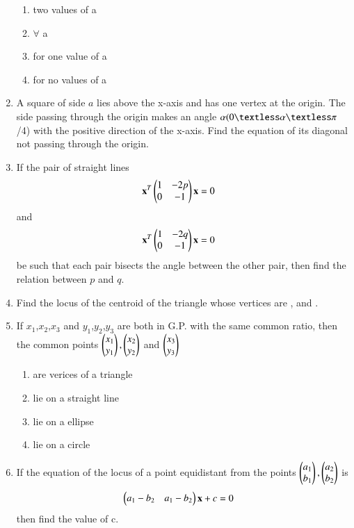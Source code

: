 \begin{enumerate}[label=\arabic*.,ref=\thesubsection.\theenumi]
    \begin{enumerate}
     \item  two values of a 
     \item  $\forall$ a
     \item  for one value of a 
     \item  for no values of a 
     \end{enumerate}
    \item A square of side $ a$ lies above the x-axis and has one vertex at the origin. The side passing through the origin makes an angle $\alpha (0\textless\alpha\textless\pi$/4) with the positive direction of the x-axis. Find the equation of its diagonal not passing through the origin.
    \item If the pair of straight lines \begin{align}\mathbf{x}^T \begin{pmatrix}1 & -2p \\ 0 & -1\end{pmatrix}\mathbf {x} &= 0\end{align} and \begin{align}\mathbf{x}^T \begin{pmatrix}1 & -2q \\ 0 & -1\end{pmatrix}\mathbf {x} &= 0\end{align} be such that each pair bisects the angle between the other pair, then find the relation between $p$ and $q$.
    \item Find the locus of the centroid of the triangle whose vertices are  ,  and .
    \item If $x_1$,$x_2$,$x_3$ and $y_1$,$y_2$,$y_3$ are both in G.P. with the same common ratio, then the common points $\begin{pmatrix}x_1\\y_1\end{pmatrix}, \begin{pmatrix}x_2\\y_2\end{pmatrix}$ and $\begin{pmatrix}x_3\\y_3\end{pmatrix}$
    \begin{enumerate}
     \item  are verices of a triangle
     \item  lie on a straight line
     \item  lie on a ellipse
     \item  lie on a circle
     \end{enumerate}
    \item If the equation of the locus of a point equidistant from the points $\begin{pmatrix}a_1\\b_1\end{pmatrix}, \begin{pmatrix}a_2\\b_2\end{pmatrix}$ is \begin{align}\begin{pmatrix}a_1-b_2 & a_1-b_2\end{pmatrix}\mathbf {x} +c &= 0 \end{align} then find the value of c. 

\end{enumerate}
